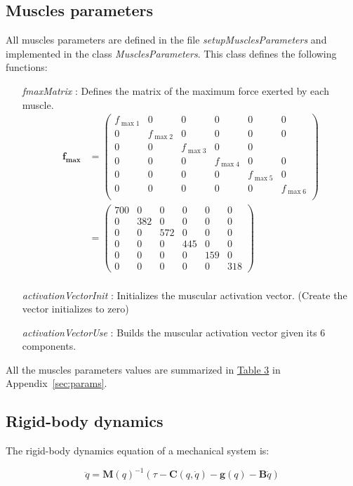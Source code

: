 \documentclass[pdftex,a4paper,11pt]{article}
\begin{document}
\subsection{Muscles parameters}
\label{sec:muscle_parameters}
All muscles parameters are defined in the file \textit{setupMusclesParameters} and implemented in the class \textit{MusclesParameters}.
This class defines the following functions:
\begin{itemize}
\item[\textit{fmaxMatrix}]: Defines the matrix of the maximum force exerted by each muscle.
\begin{align*}
\textbf{f}_\textbf{max}   & = \begin{pmatrix}
f_{\max1} &0&0&0&0&0\\
0& f_{\max2}&0&0&0&0\\
0&0& f_{\max3} &0&0\\
0&0&0& f_{\max4} &0&0\\
0&0&0&0& f_{\max5} &0\\
0&0&0&0&0& f_{\max6}\\
\end{pmatrix} \\& = \begin{pmatrix}
700 &0&0&0&0&0\\
 0&382&0&0&0&0\\
0&0 & 572 & 0&0&0\\
0&0&0&445 &0&0\\
0&0&0&0&159 &0\\
0&0&0&0&0&318
\end{pmatrix}\\
\end{align*}
\item[\textit{activationVectorInit}]: Initializes the muscular activation vector. (Create the vector initializes to zero)
\item[\textit{activationVectorUse}]: Builds the muscular activation vector given its 6 components.
\end{itemize}
All the muscles parameters values are summarized in \hyperref[MuscleParamTable]{Table 3} in Appendix~\ref{sec:params}.

\subsection{Rigid-body dynamics}
\label{sec:arm_dynamics}
The rigid-body dynamics equation of a mechanical system is:

 \begin{equation}
\label{eq:rbd}
    \ddot{q} = \textbf{M}(q)^{-1} (\tau - \textbf{C}(q, \dot{q}) - \textbf{g}(q)  - \textbf{B} \dot{q}) 
\end{equation}
\end{document}
